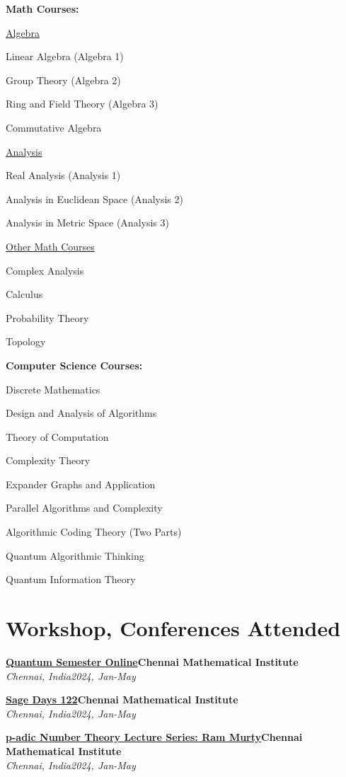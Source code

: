 \documentclass[letterpaper,10pt]{article}
\newcommand{\heading}[2]{
  \hspace{0pt}#1\hfill#2\\
}
\newcommand{\headingBf}[2]{
  \heading{\textbf{#1}}{\textbf{#2}}
}
\newcommand{\headingIt}[2]{
  \heading{\textit{#1}}{\textit{#2}}
}
\newenvironment{resume_list}{
  \vspace{-7pt}
  \begin{itemize}[itemsep=-2px, parsep=1pt, leftmargin=30pt, label={$\circ$}]
}{
  \end{itemize}
}
\newcommand{\itemTitle}[1]{
  \item[] \underline{#1}\vspace{5pt}
}
\begin{document}
\begin{multicols}{2}
	\headingBf{Math Courses:}{}
	
\begin{resume_list}
	\itemTitle{Algebra}
	\item Linear Algebra (Algebra 1)
	\item Group Theory (Algebra 2)
	\item Ring and  Field Theory (Algebra 3)
	\item Commutative Algebra
	\itemTitle{Analysis}
	\item Real Analysis (Analysis 1)
	\item Analysis in Euclidean Space (Analysis 2)
	\item Analysis in Metric Space (Analysis 3)
	\vspace{3pt}
	\itemTitle{Other Math Courses}
	\item Complex Analysis
	\item Calculus
	\item Probability Theory
	\item Topology
\end{resume_list}
\columnbreak

\headingBf{Computer Science Courses:}{}
\begin{resume_list}
	\item Discrete Mathematics
	\item  Design and Analysis of Algorithms
	\item  Theory of Computation
	\item Complexity Theory
	\item  Expander Graphs and Application
	\item Parallel Algorithms and Complexity
	\item  Algorithmic Coding Theory (Two Parts)
	\item  Quantum Algorithmic Thinking
	\item  Quantum Information Theory
\end{resume_list}
\end{multicols}

\section{Workshop, Conferences Attended}
\begin{resume_list}
	\item \headingBf{\href{https://www.cmi.ac.in/activities/kohli-centre/quantum-semester-2024/}{Quantum Semester Online}}{Chennai Mathematical Institute}
	\headingIt{Chennai, India}{2024, Jan-May}{}
	\item \headingBf{\href{https://www.cmi.ac.in/~mkummini/sagedays122/index.html}{Sage Days 122}}{Chennai Mathematical Institute}
	\headingIt{Chennai, India}{2024, Jan-May}{}
	\item \headingBf{\href{https://sohamch08.github.io/assets/certificates_merged_SohamChatterjee.pdf}{p-adic Number Theory Lecture Series: Ram Murty}}{Chennai Mathematical Institute}
	\headingIt{Chennai, India}{2024, Jan-May}{}
\end{resume_list}
\end{document}
